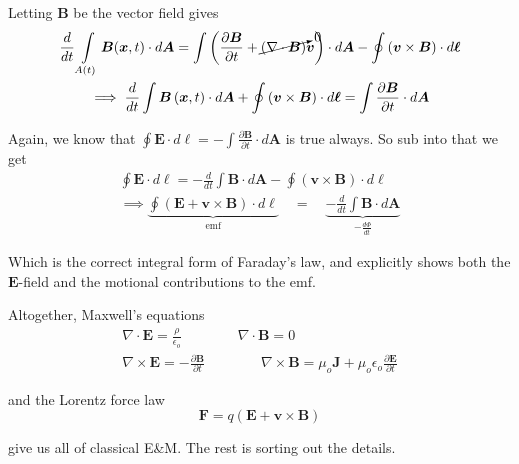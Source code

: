 \documentclass{article}
\begin{document}
Letting $\bm{B}$ be the vector field gives
\begin{gather*}
    \frac{d}{dt} \int\limits_{A(t)} \bm{B}(\bm{x}, t) \cdot d\bm{A} = \int \left( \frac{\partial \bm{B}}{\partial t} + \cancelto{0}{\left( \nabla \cdot \bm{B} \right)} \bm{v} \right) \cdot d\bm{A} - \oint \left( \bm{v} \times \bm{B} \right) \cdot d\bm{\ell} \\
    \implies \frac{d}{dt} \int \bm{B} \left( \bm{x}, t \right) \cdot d\bm{A} + \oint \left( \bm{v} \times \bm{B} \right) \cdot d\bm{\ell} = \int \frac{\partial \bm{B}}{\partial t} \cdot d\bm{A}
\end{gather*}

Again, we know that $\displaystyle \oint \bm{E} \cdot d\bm{\ell} = -\int \frac{\partial \bm{B}}{\partial t} \cdot d\bm{A}$ is true always. So sub into that we get
\begin{gather*}
    \oint \bm{E} \cdot d\bm{\ell} = -\frac{d}{dt} \int \bm{B} \cdot d\bm{A} - \oint \left( \bm{v} \times \bm{B} \right) \cdot d\bm{\ell} \\
    \implies \underbrace{\oint \left( \bm{E} + \bm{v} \times \bm{B} \right) \cdot d\bm{\ell}}_{\displaystyle \text{emf}} \quad = \quad \underbrace{-\frac{d}{dt} \int \bm{B} \cdot d\bm{A}}_{\displaystyle -\frac{d\Phi}{dt}}
\end{gather*}

Which is the correct integral form of Faraday's law, and explicitly shows both the $\bm{E}$-field and the motional contributions to the emf.

\vspace{1cm}

Altogether, Maxwell's equations
\begin{gather*}
    \nabla \cdot \bm{E} = \frac{\rho}{\epsilon_o} \qquad\qquad \nabla \cdot \bm{B} = 0 \\
    \nabla \times \bm{E} = -\frac{\partial \bm{B}}{\partial t} \qquad\qquad \nabla \times \bm{B} = \mu_o \bm{J} + \mu_o\epsilon_o \frac{\partial \bm{E}}{\partial t}
\end{gather*}

and the Lorentz force law
\begin{equation*}
    \bm{F} = q\left( \bm{E} + \bm{v} \times \bm{B} \right)
\end{equation*}

give us all of classical E\&M. The rest is sorting out the details.
\end{document}
